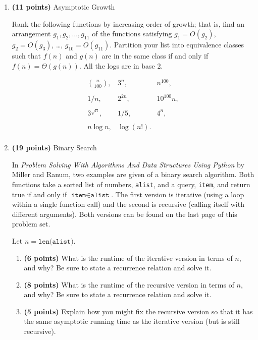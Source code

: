 \documentclass[12pt,twoside]{article}
\begin{document}
\begin{enumerate}

\item {\bf (11 points)} Asymptotic Growth

Rank the following functions by increasing order of growth; that is,
find an arrangement $g_1, g_2, \ldots, g_{11}$ of the functions
satisfying $g_1=O(g_2)$, $g_2=O(g_3)$, \ldots, $g_{10}=O(g_{11})$.
Partition your list into equivalence classes such that $f(n)$ and
$g(n)$ are in the same class if and only if $f(n)=\Theta(g(n))$. All
the logs are in base 2.

\[
\begin{array}{llll}
{n \choose 100}, 
& 3^n,
& n^{100},\\
~\\
1/n, 
& 2^{2n},
& 10^{100}n,\\
~\\
3^{\sqrt{n}}, 
& 1/5, & 4^n,\\
~\\
n\log n, 
& \log(n!). \\
\end{array}
\]

\item {\bf (19 points)} Binary Search
  
  In \emph{Problem Solving With Algorithms And Data Structures
  Using Python} by Miller and Ranum, two examples are given of a
  binary search algorithm. Both functions take a sorted list of
  numbers, \texttt{alist}, and a query, \texttt{item}, and return true
  if and only if $\texttt{item} \in \texttt{alist}$.  The first
  version is iterative (using a loop within a single function call)
  and the second is recursive (calling itself with different
  arguments). Both versions can be found on the last page of this
  problem set.
  
  Let $n = \texttt{len(alist)}$.

  \begin{enumerate}

  \item {\bf (6 points)} What is the runtime of the iterative version
    in terms of $n$, and why? Be sure to state a recurrence relation
    and solve it.

  \item {\bf (8 points)} What is the runtime of the recursive version
    in terms of $n$, and why? Be sure to state a recurrence relation
    and solve it.

  \item {\bf (5 points)} Explain how you might fix the recursive
    version so that it has the same asymptotic running time as the
    iterative version (but is still recursive).
    

\end{enumerate}
\end{enumerate}
\end{document}

